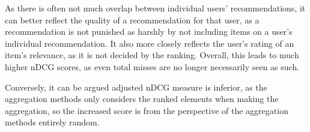 As there is often not much overlap between individual users' recommendations, it can better reflect the quality of a recommendation for that user, as a recommendation is not punished as harshly by not including items on a user's individual recommendation. It also more closely reflects the user's rating of an item's relevance, as it is not decided by the ranking. Overall, this leads to much higher nDCG scores, as even total misses are no longer necessarily seen as such.

Conversely, it can be argued adjusted nDCG measure is inferior, as the aggregation methods only considers the ranked elements when making the aggregation, so the increased score is from the perspective of the aggregation methods entirely random.